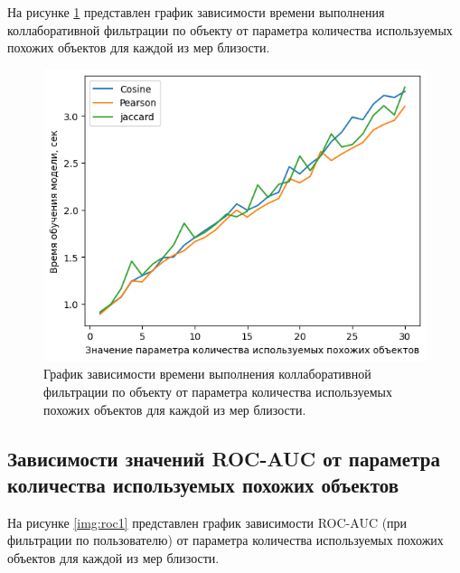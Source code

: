 На рисунке \ref{img:time2} представлен график зависимости времени выполнения коллаборативной фильтрации по объекту от параметра количества используемых похожих объектов для каждой из мер близости.

\begin{figure}[H]
	\centering
	\includegraphics[width=\textwidth]{inc/timesItem.png}
	\caption{ График зависимости времени выполнения коллаборативной фильтрации по объекту от параметра количества используемых похожих объектов для каждой из мер близости.}
	\label{img:time2}
\end{figure}

\subsection{Зависимости значений ROC-AUC от параметра количества используемых похожих объектов}

На рисунке \ref{img:roc1} представлен график зависимости ROC-AUC (при фильтрации по пользователю) от параметра количества используемых похожих объектов для каждой из мер близости.

